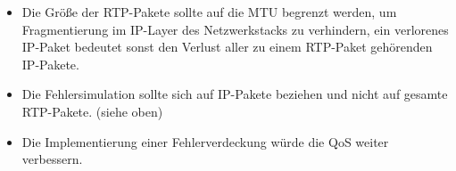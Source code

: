 \documentclass[12pt,a4paper]{article}
\begin{document}
\begin{itemize}
\item Die Größe der RTP-Pakete sollte auf die MTU begrenzt werden, um Fragmentierung im IP-Layer des Netzwerkstacks zu verhindern, ein verlorenes IP-Paket bedeutet sonst den Verlust aller zu einem RTP-Paket gehörenden IP-Pakete.
\item Die Fehlersimulation sollte sich auf IP-Pakete beziehen und nicht auf gesamte RTP-Pakete. (siehe oben)
\item Die Implementierung einer Fehlerverdeckung würde die QoS weiter verbessern.
\end{itemize}
\end{document}
